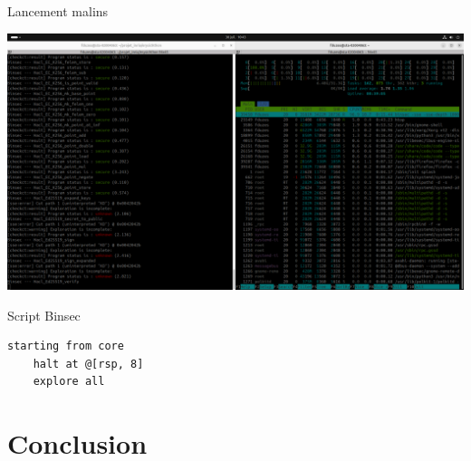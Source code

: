 \documentclass[A4,svgnames,9pt,aspectratio=169]{beamer}
\begin{document}

\begin{frame}{Lancement malins}
  \begin{center}
    \includegraphics[scale = 0.18]{imgs/htop.png}
  \end{center}
\end{frame}

\begin{frame}[fragile]{Script Binsec}

  \begin{lstlisting}[style=INIStyle, caption={\textbf{*}.ini}, gobble=4]
    starting from core
    halt at @[rsp, 8]
    explore all
  \end{lstlisting}

\end{frame}


\section{Conclusion}
\frame{\sectionpage}
\end{document}
